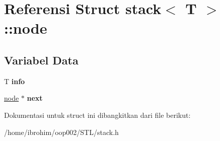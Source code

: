 \hypertarget{structstack_1_1node}{}\section{Referensi Struct stack$<$ T $>$\+:\+:node}
\label{structstack_1_1node}
\subsection*{Variabel Data}
\begin{DoxyCompactItemize}
\item 
\hypertarget{structstack_1_1node_afe2f52d3b44de8a7ec810ff40242993d}{}T {\bfseries info}\label{structstack_1_1node_afe2f52d3b44de8a7ec810ff40242993d}

\item 
\hypertarget{structstack_1_1node_ab9a2ff4f64ad6c0ef5999a8132cf8d69}{}\hyperlink{structstack_1_1node}{node} $\ast$ {\bfseries next}\label{structstack_1_1node_ab9a2ff4f64ad6c0ef5999a8132cf8d69}

\end{DoxyCompactItemize}


Dokumentasi untuk struct ini dibangkitkan dari file berikut\+:\begin{DoxyCompactItemize}
\item 
/home/ibrohim/oop002/\+S\+T\+L/stack.\+h\end{DoxyCompactItemize}

